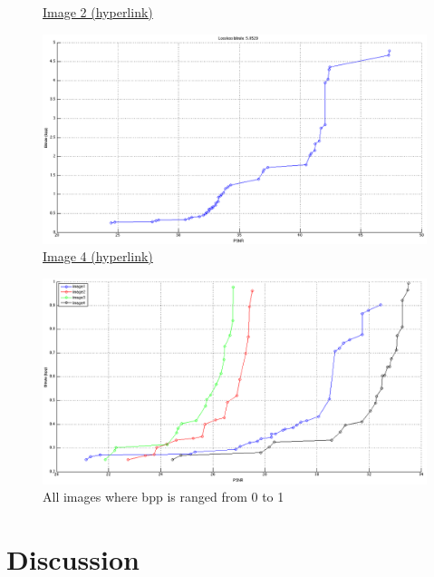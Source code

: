 \documentclass[12pt]{article}
\begin{document}
\begin{enumerate}
\begin{figure}[ht]
\begin{minipage}[c]{0.6\linewidth}
				\caption*{\href{https://github.com/HW-Lee/ImageCodec/blob/master/results/2_1024x768/original.png}{Image 2 (hyperlink)}}
				\includegraphics[scale=.28]{./res/BD_curve/BD4.png}
				\caption*{\href{https://github.com/HW-Lee/ImageCodec/blob/master/results/4_1000x1504/original.png}{Image 4 (hyperlink)}}
			\end{minipage}
		\end{figure}
		\vspace{10em}
		\begin{figure}[ht]
			\vspace{-11em}
			\centering
			\includegraphics[scale=.5]{./res/BD_curve/BD_overall.png}
			\caption{All images where bpp is ranged from 0 to 1}
			\vspace*{-5em}
		\end{figure}
\end{enumerate}

\newpage
\section*{Discussion}
\vspace{-20pt}
\noindent\makebox[\linewidth]{\rule{\textwidth}{0.4pt}}
\end{document}
